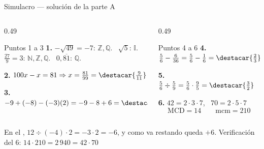 \documentclass[aspectratio=169,10pt]{beamer}
\begin{document}
\begin{frame}{Simulacro — solución de la parte A}
  \scriptsize
  \begin{columns}[T,onlytextwidth]
    \begin{column}{0.49\textwidth}
      \begin{block}{Puntos 1 a 3}
        \tiny
        \textbf{1.} $-\sqrt{49}=-7$: $\mathbb{Z},\mathbb{Q}$. \
        $\sqrt{5}$: $\mathbb{I}$. \ $\tfrac{27}{9}=3$:
        $\mathbb{N},\mathbb{Z},\mathbb{Q}$. \ $0{,}\overline{81}$:
        $\mathbb{Q}$.

        \vspace{0.08cm}
        \textbf{2.} $100x - x = 81 \Rightarrow x = \tfrac{81}{99}
        = \destacar{\tfrac{9}{11}}$

        \vspace{0.08cm}
        \textbf{3.} $-9 + (-8) - (-3)(2) = -9-8+6 = \destacar{-11}$
      \end{block}
    \end{column}
    \begin{column}{0.49\textwidth}
      \begin{block}{Puntos 4 a 6}
        \tiny
        \textbf{4.} $\tfrac{5}{6} - \tfrac{6}{36}
        = \tfrac{5}{6}-\tfrac{1}{6} = \destacar{\tfrac{2}{3}}$

        \vspace{0.08cm}
        \textbf{5.} $\tfrac{5}{6}\div\tfrac{5}{9}
        = \tfrac{5}{6}\cdot\tfrac{9}{5} = \destacar{\tfrac{3}{2}}$

        \vspace{0.08cm}
        \textbf{6.} $42 = 2\cdot 3\cdot 7$, \ $70 = 2\cdot 5\cdot 7$
        \[ \mathrm{MCD} = 14 \qquad \mathrm{mcm} = 210 \]
      \end{block}
    \end{column}
  \end{columns}

  \vspace{0.05cm}
  {\tiny\color{uniGris} En el , $12\div(-4)\cdot 2 = -3\cdot 2
  = -6$, y como va restando queda $+6$. Verificación del 6:
  $14\cdot 210 = 2\,940 = 42\cdot 70$ \checkmark}
\end{frame}
\end{document}

